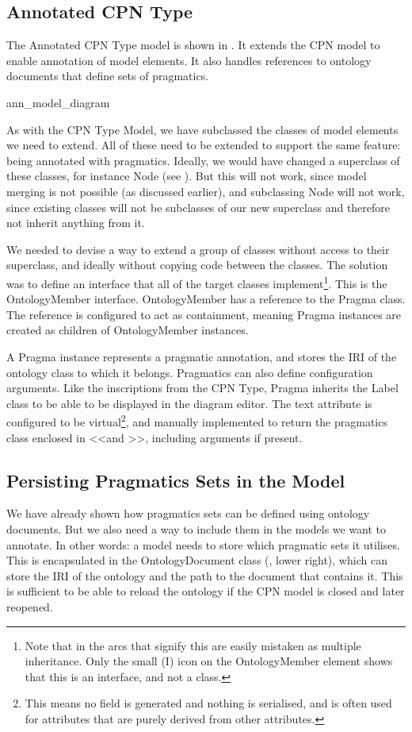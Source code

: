 \subsection{Annotated CPN Type}
The Annotated CPN Type model is shown in . It extends
the CPN model to enable annotation of model elements. It also handles references
to ontology documents that define sets of pragmatics.

{ann_model_diagram}

As with the CPN Type Model, we have subclassed the classes of model elements we
need to extend. All of these need to be extended to support the same feature:
being annotated with pragmatics. Ideally, we would have changed a superclass of
these classes, for instance Node (see ). But this will not
work, since model merging is not possible (as discussed earlier), and
subclassing Node will not work, since existing classes will not be subclasses of
our new superclass and therefore not inherit anything from it.

We needed to devise a way to extend a group of classes without access to their
superclass, and ideally without copying code between the classes. The solution
was to define an interface that all of the target classes
implement\footnote{Note that in  the arcs that signify
this are easily mistaken as multiple inheritance. Only the small (I) icon on
the OntologyMember element shows that this is an interface, and not a class.}.
This is the OntologyMember interface. OntologyMember has a reference to the Pragma class.
The reference is configured to act as containment, meaning Pragma instances are
created as children of OntologyMember instances. 

A Pragma instance represents a pragmatic annotation, and stores the IRI of the
ontology class to which it belongs. Pragmatics can also define configuration
arguments. Like the inscriptions from the CPN Type, Pragma inherits the Label
class to be able to be displayed in the diagram editor. The text attribute is
configured to be virtual\footnote{This means no field is generated and nothing
is serialised, and is often used for attributes that are purely derived from
other attributes.}, and manually implemented to return the pragmatics class
enclosed in \textless\textless and \textgreater\textgreater, including arguments
if present.

\subsection{Persisting Pragmatics Sets in the Model}
We have already shown how pragmatics sets can be defined using ontology
documents. But we also need a way to include them in the models we want to
annotate. In other words: a model needs to store which pragmatic sets it
utilises. This is encapsulated in the OntologyDocument class
(, lower right), which can store the IRI of the
ontology and the path to the document that contains it. This is sufficient to be
able to reload the ontology if the CPN model is closed and later reopened.

